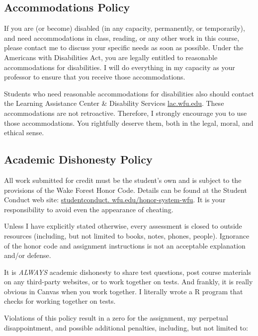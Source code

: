 \documentclass[11pt,]{article}
\begin{document}
\hypertarget{accommodations-policy}{%
\subsection{Accommodations Policy}\label{accommodations-policy}}

If you are (or become) disabled (in any capacity, permanently, or
temporarily), and need accommodations in class, reading, or any other
work in this course, please contact me to discuss your specific needs as
soon as possible. Under the Americans with Disabilities Act, you are
legally entitled to reasonable accommodations for disabilities. I will
do everything in my capacity as your professor to ensure that you
receive those accommodations.

Students who need reasonable accommodations for disabilities also should
contact the Learning Assistance Center \& Disability Services
\href{https://lac.wfu.edu/}{lac.wfu.edu}. These accommodations are not
retroactive. Therefore, I strongly encourage you to use those
accommodations. You rightfully deserve them, both in the legal, moral,
and ethical sense.

\hypertarget{academic-dishonesty-policy}{%
\subsection{Academic Dishonesty
Policy}\label{academic-dishonesty-policy}}

All work submitted for credit must be the student's own and is subject
to the provisions of the Wake Forest Honor Code. Details can be found at
the Student Conduct web site:
\href{https://studentconduct.wfu.edu/honor-system-wfu/}{studentconduct.
wfu.edu/honor-system-wfu}. It is your responsibility to avoid even the
appearance of cheating.

Unless I have explicitly stated otherwise, every assessment is closed to
outside resources (including, but not limited to books, notes, phones,
people). Ignorance of the honor code and assignment instructions is not
an acceptable explanation and/or defense.

It is \emph{ALWAYS} academic dishonesty to share test questions, post
course materials on any third-party websites, or to work together on
tests. And frankly, it is really obvious in Canvas when you work
together. I literally wrote a R program that checks for working together
on tests.

Violations of this policy result in a zero for the assignment, my
perpetual disappointment, and possible additional penalties, including,
but not limited to:
\end{document}
